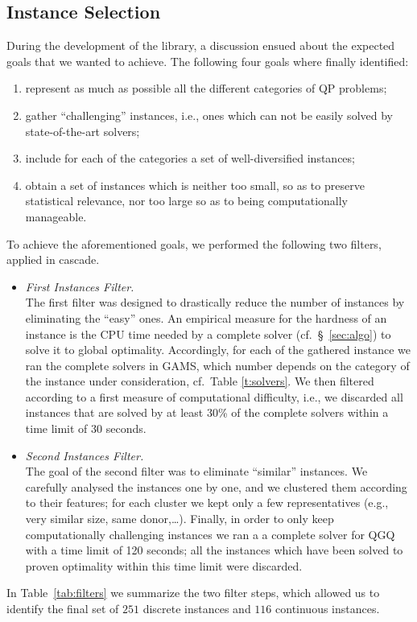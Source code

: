\subsection{Instance Selection}\label{subsec:selection}

During the development of the library, a discussion ensued about
the expected goals that we wanted to achieve. The following four goals
where finally identified:
%
\begin{enumerate}
 \item represent as much as possible all the different categories of QP
       problems;
 \item gather ``challenging'' instances, i.e., ones which can not be easily
       solved by  state-of-the-art solvers;
 \item include for each of the categories a set of well-diversified
       instances;
 \item obtain a set of instances which is neither too small, so as to
       preserve statistical relevance, nor too large so as to being
       computationally manageable.
\end{enumerate}
%
To achieve the aforementioned goals, we performed the following two
filters, applied in cascade.
%
\begin{itemize}
 \item \emph{First Instances Filter.}\\
       The first filter was designed to drastically reduce the number of
       instances by eliminating the ``easy'' ones. An empirical measure
       for the hardness of an instance is the CPU time needed by a
       complete solver (cf.~\S~\ref{sec:algo}) to solve it to
       global optimality. Accordingly, for each of the gathered instance we
       ran the complete solvers in GAMS, which number depends on the category
       of the instance under consideration, cf.~Table \ref{t:solvers}.
       We then filtered according to a first
       measure of computational difficulty, i.e., we discarded all instances
       that are solved by at least 30\% of the complete solvers within a time
       limit of 30 seconds.
 \item \emph{Second Instances Filter.}\\
       The goal of the second filter was to eliminate ``similar'' instances.
       We carefully analysed the instances one by one, and we clustered them
       according to their features; for each cluster we kept only a few
       representatives (e.g., very similar size, same donor,\ldots). Finally, in order to only
       keep computationally challenging instances we ran a a complete solver for QGQ with a time limit of 120 seconds; all the
       instances which have been solved to proven optimality within this time limit
       were discarded.
\end{itemize}
%
In Table~\ref{tab:filters} we summarize the two filter steps, which
allowed us to identify the final set of $251$ discrete instances and
$116$ continuous instances.

